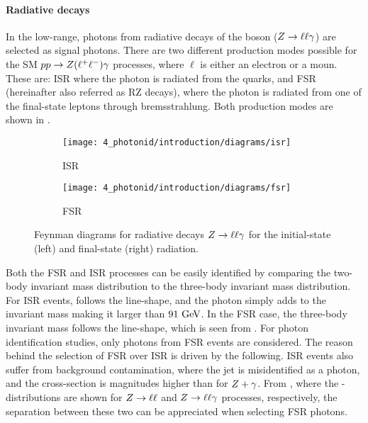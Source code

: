 \paragraph{Radiative \Zboson decays}

In the low-\pt range, photons from radiative decays of the \Zboson boson (\(Z \rightarrow \ell\ell \gamma\)) are selected as signal photons. There are two different production modes possible for the \ac{SM} \(pp\rightarrow Z(\ell^{+} \ell^{-})\gamma\) processes, where \(\ell\) is either an electron or a moun. These are: \acf{ISR} where the photon is radiated from the quarks, and \acf{FSR} (hereinafter also referred as \acf{RZ} decays), where the photon is radiated from one of the final-state leptons through bremsstrahlung. Both production modes are shown in \Fig{\ref{fig:pid_ss:event_selection:fsr_isr}}.

\begin{figure}[ht!]
    \centering
    \begin{subfigure}[h]{0.49\linewidth}
        \centering
        \texttt{[image: 4\_photonid/introduction/diagrams/isr]}
        \caption{\acf{ISR}}
    \end{subfigure}
    \hfill
    \begin{subfigure}[h]{0.49\linewidth}
        \centering
        \texttt{[image: 4\_photonid/introduction/diagrams/fsr]}
        \caption{\acf{FSR}}
    \end{subfigure}
    \caption{Feynman diagrams for radiative \Zboson decays \(Z\rightarrow\ell\ell\gamma\) for the initial-state (left) and final-state (right) radiation.}
    \label{fig:pid_ss:event_selection:fsr_isr}
\end{figure}


Both the \ac{FSR} and \ac{ISR} processes can be easily identified by comparing the two-body invariant mass \mll distribution to the three-body invariant mass \mlly distribution.
For \ac{ISR} events, \mll follows the \Zboson line-shape, and the photon simply adds to the invariant mass making it larger than \(91~\text{GeV}\). In the \ac{FSR} case, the three-body invariant mass \mlly follows the \Zboson line-shape, which is seen from \Fig{\ref{fig:pid_ss:event_selection:mll_mlly_distribution:data}}.
For photon identification studies, only photons from \ac{FSR} events are considered. The reason behind the selection of \ac{FSR} over \ac{ISR} is driven by the following. \ac{ISR} events also suffer from \Zjets background contamination, where the jet is misidentified as a photon, and the \Zjets cross-section is magnitudes higher than for \(Z+\gamma\). From \Figs{\ref{fig:pid_ss:event_selection:mll_mlly_distribution:bkg}}{\ref{fig:pid_ss:event_selection:mll_mlly_distribution:signal}}, where the \mll-\mlly distributions are shown for \(Z\rightarrow\ell\ell\) and \(Z\rightarrow\ell\ell\gamma\) processes, respectively, the separation between these two can be appreciated when selecting \ac{FSR} photons.

